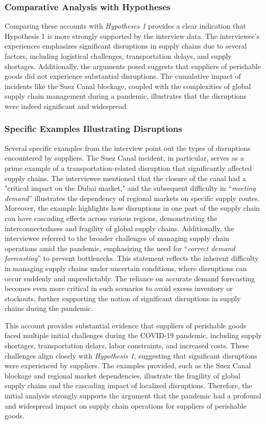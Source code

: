 \subsubsection{Comparative Analysis with Hypotheses}

Comparing these accounts with \textit{Hypotheses 1} provides a clear indication that Hypothesis 1 is more strongly supported by the interview data. The interviewee's experiences emphasizes significant disruptions in supply chains due to several factors, including logistical challenges, transportation delays, and supply shortages. Additionally, the arguments posed suggests that suppliers of perishable goods did not experience substantial disruptions. The cumulative impact of incidents like the Suez Canal blockage, coupled with the complexities of global supply chain management during a pandemic, illustrates that the disruptions were indeed significant and widespread.

\subsubsection{Specific Examples Illustrating Disruptions}

Several specific examples from the interview point out the types of disruptions encountered by suppliers. The Suez Canal incident, in particular, serves as a prime example of a transportation-related disruption that significantly affected supply chains. The interviewee mentioned that the closure of the canal had a "critical impact on the Dubai market," and the subsequent difficulty in “\textit{meeting demand}” illustrates the dependency of regional markets on specific supply routes. Moreover, the example highlights how disruptions in one part of the supply chain can have cascading effects across various regions, demonstrating the interconnectedness and fragility of global supply chains. Additionally, the interviewee referred to the broader challenges of managing supply chain operations amid the pandemic, emphasizing the need for “\textit{correct demand forecasting}” to prevent bottlenecks. This statement reflects the inherent difficulty in managing supply chains under uncertain conditions, where disruptions can occur suddenly and unpredictably. The reliance on accurate demand forecasting becomes even more critical in such scenarios to avoid excess inventory or stockouts, further supporting the notion of significant disruptions in supply chains during the pandemic. 

This account provides substantial evidence that suppliers of perishable goods faced multiple initial challenges during the COVID-19 pandemic, including supply shortages, transportation delays, labor constraints, and increased costs. These challenges align closely with \textit{Hypothesis 1}, suggesting that significant disruptions were experienced by suppliers. The examples provided, such as the Suez Canal blockage and regional market dependencies, illustrate the fragility of global supply chains and the cascading impact of localized disruptions. Therefore, the initial analysis strongly supports the argument that the pandemic had a profound and widespread impact on supply chain operations for suppliers of perishable goods.

